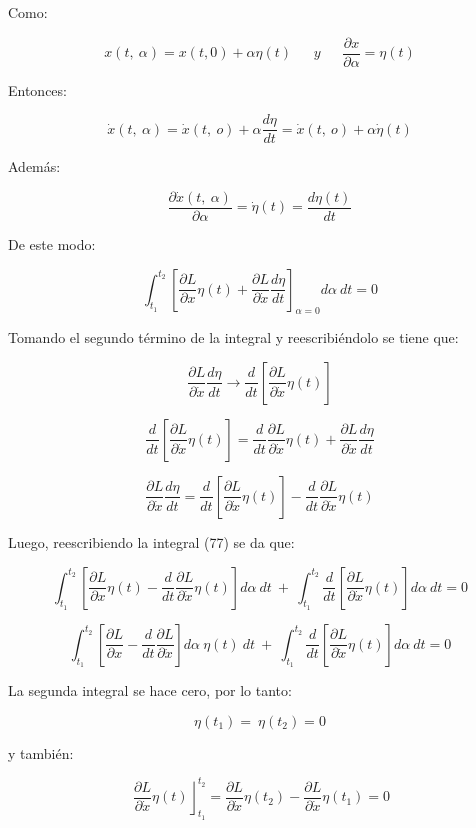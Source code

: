 \documentclass[]{article}
\begin{document}
Como:

\[x(t,\ \alpha) = x(t,0) + \alpha\eta(t)\ \ \ \ \ \ \ y\ \ \ \ \ \ \ \frac{\partial x}{\partial\alpha} = \eta(t)\]

Entonces:

\[\dot{x}(t,\ \alpha) = \dot{x}(t,\ o) + \alpha\frac{d\eta}{dt} = \dot{x}(t,\ o) + \alpha\dot{\eta}(t)\]

Además:

\[\frac{\partial\dot{x}(t,\ \alpha)}{\partial\alpha} = \dot{\eta}(t) = \frac{d\eta(t)}{dt}\]

De este modo:

\[\int_{t_{1}}^{t_{2}}{\left\lbrack \frac{\partial L}{\partial x}\eta(t) + \frac{\partial L}{\partial\dot{x}}\frac{d\eta}{dt} \right\rbrack_{\alpha = 0}d\alpha\ dt = 0}\]

Tomando el segundo término de la integral y reescribiéndolo se tiene
que:

\[\frac{\partial L}{\partial\dot{x}}\frac{d\eta}{dt} \rightarrow \frac{d}{dt}\left\lbrack \frac{\partial L}{\partial\dot{x}}\eta(t) \right\rbrack\]

\[\frac{d}{dt}\left\lbrack \frac{\partial L}{\partial\dot{x}}\eta(t) \right\rbrack = \frac{d}{dt}\frac{\partial L}{\partial\dot{x}}\eta(t) + \frac{\partial L}{\partial\dot{x}}\frac{d\eta}{dt}\]

\[\frac{\partial L}{\partial\dot{x}}\frac{d\eta}{dt} = \frac{d}{dt}\left\lbrack \frac{\partial L}{\partial\dot{x}}\eta(t) \right\rbrack - \frac{d}{dt}\frac{\partial L}{\partial\dot{x}}\eta(t)\]

Luego, reescribiendo la integral (77) se da que:

\[\int_{t_{1}}^{t_{2}}{\left\lbrack \frac{\partial L}{\partial x}\eta(t) - \frac{d}{dt}\frac{\partial L}{\partial\dot{x}}\eta(t) \right\rbrack d\alpha\ dt\  + \ \int_{t_{1}}^{t_{2}}{\frac{d}{dt}\left\lbrack \frac{\partial L}{\partial\dot{x}}\eta(t) \right\rbrack d\alpha\ dt} = 0}\]

\[\int_{t_{1}}^{t_{2}}{\left\lbrack \frac{\partial L}{\partial x} - \frac{d}{dt}\frac{\partial L}{\partial\dot{x}} \right\rbrack d\alpha\ \eta(t)\ dt\  + \ \int_{t_{1}}^{t_{2}}{\frac{d}{dt}\left\lbrack \frac{\partial L}{\partial\dot{x}}\eta(t) \right\rbrack d\alpha\ dt} = 0}\]

La segunda integral se hace cero, por lo tanto:

\[\eta(t_{1}) = \ \eta\left( t_{2} \right) = 0\]

y también:

\[\left. \ \frac{\partial L}{\partial\dot{x}}\eta(t) \right\rfloor_{t_{1}}^{t_{2}} = \frac{\partial L}{\partial\dot{x}}\eta\left( t_{2} \right) - \frac{\partial L}{\partial\dot{x}}\eta\left( t_{1} \right) = 0\]
\end{document}
